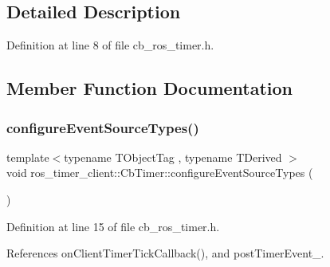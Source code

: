 \subsection{Detailed Description}


Definition at line 8 of file cb\+\_\+ros\+\_\+timer.\+h.



\subsection{Member Function Documentation}
\mbox{\label{classros__timer__client_1_1CbTimer_a11226b0050d363187aa1bfe3e9c672af}} 
\subsubsection{\texorpdfstring{configure\+Event\+Source\+Types()}{configureEventSourceTypes()}}
{\footnotesize\ttfamily template$<$typename T\+Object\+Tag , typename T\+Derived $>$ \\
void ros\+\_\+timer\+\_\+client\+::\+Cb\+Timer\+::configure\+Event\+Source\+Types (\begin{DoxyParamCaption}{ }\end{DoxyParamCaption})\hspace{0.3cm}{\ttfamily [inline]}}



Definition at line 15 of file cb\+\_\+ros\+\_\+timer.\+h.



References on\+Client\+Timer\+Tick\+Callback(), and post\+Timer\+Event\+\_\+.


